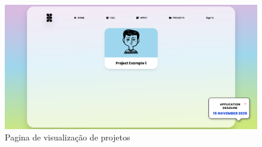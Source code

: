 \begin{figure}[h!tbp]
    \centering
    \includegraphics[width=\linewidth]{capitulos/cap4-implementacao/assets/frontend/blended-project-page.png}
    \caption{Pagina de visualização de projetos}
    \label{fig:frontend-project-page}
\end{figure}